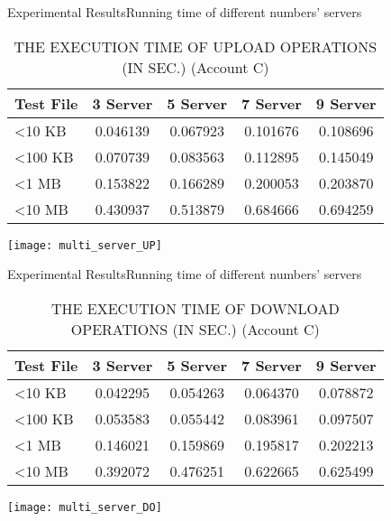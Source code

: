 \begin{frame}{Experimental Results}{Running time of different numbers' servers}
	\scriptsize
	\begin{table}[]
    \centering
    \caption{THE EXECUTION TIME OF \alert{UPLOAD} OPERATIONS (IN SEC.) (Account C)}
    \begin{tabular}{lcccc}
        Test File        & 3 Server & 5 Server & 7 Server & 9 Server \\ \hline
        \textless 10 KB  & 0.046139 & 0.067923 & 0.101676 & 0.108696 \\ \hline
        \textless 100 KB & 0.070739 & 0.083563 & 0.112895 & 0.145049 \\ \hline
        \textless 1 MB   & 0.153822 & 0.166289 & 0.200053 & 0.203870 \\ \hline
        \textless 10 MB  & 0.430937 & 0.513879 & 0.684666 & 0.694259 \\ \hline
    \end{tabular}
    \end{table}
    \begin{center}
	    \texttt{[image: multi\_server\_UP]}
    \end{center}
\end{frame}

\begin{frame}{Experimental Results}{Running time of different numbers' servers}
	\scriptsize
    \begin{table}[]
    \centering
    \caption{THE EXECUTION TIME OF \alert{DOWNLOAD} OPERATIONS (IN SEC.) (Account C)}
    \begin{tabular}{lcccc}
        Test File        & 3 Server & 5 Server & 7 Server & 9 Server \\ \hline
        \textless 10 KB  & 0.042295 & 0.054263 & 0.064370 & 0.078872 \\ \hline
        \textless 100 KB & 0.053583 & 0.055442 & 0.083961 & 0.097507 \\ \hline
        \textless 1 MB   & 0.146021 & 0.159869 & 0.195817 & 0.202213 \\ \hline
        \textless 10 MB  & 0.392072 & 0.476251 & 0.622665 & 0.625499 \\ \hline
    \end{tabular}
    \end{table}
    \begin{center}
	    \texttt{[image: multi\_server\_DO]}
    \end{center}
\end{frame}